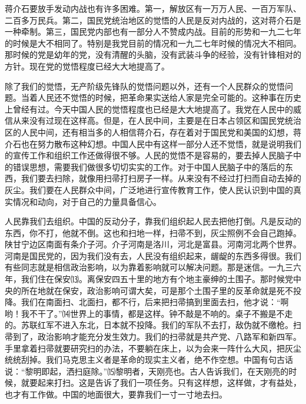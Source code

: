 \documentclass[UTF-8, a5paper, 12pt]{ctexart}
\begin{document}
    蒋介石要放手发动内战也有许多困难。第一，解放区有一万万人民、一百万军队、二百多万民兵。第二，国民党统治地区的觉悟的人民是反对内战的，这对蒋介石是一种牵制。第三，国民党内部也有一部分人不赞成内战。目前的形势和一九二七年的时候是大不相同了。特别是我党目前的情况和一九二七年时候的情况大不相同。那时候的党是幼年的党，没有清醒的头脑，没有武装斗争的经验，没有针锋相对的方针。现在党的觉悟程度已经大大地提高了。
    
    除了我们的觉悟，无产阶级先锋队的觉悟问题以外，还有一个人民群众的觉悟问题。当着人民还不觉悟的时候，把革命果实送给人家是完全可能的。这种事在历史上曾经有过。今天中国人民的觉悟程度也已经是大大地提高了。我党在人民中的威信从来没有过现在这样高。但是，在人民中间，主要是在日本占领区和国民党统治区的人民中间，还有相当多的人相信蒋介石，存在着对于国民党和美国的幻想，蒋介石也在努力散布这种幻想。中国人民中有这样一部分人还不觉悟，就是说明我们的宣传工作和组织工作还做得很不够。人民的觉悟不是容易的，要去掉人民脑子中的错误思想，需要我们做很多切切实实的工作。对于中国人民脑子中的落后的东西，我们要去扫除，就像用扫帚打扫房子一样。从来没有不经过打扫而自动去掉的灰尘。我们要在人民群众中间，广泛地进行宣传教育工作，使人民认识到中国的真实情况和动向，对于自己的力量具备信心。
    
    人民靠我们去组织。中国的反动分子，靠我们组织起人民去把他打倒。凡是反动的东西，你不打，他就不倒。这也和扫地一样，扫帚不到，灰尘照例不会自己跑掉。陕甘宁边区南面有条介子河。介子河南是洛川，河北是富县。河南河北两个世界。河南是国民党的，因为我们没有去，人民没有组织起来，龌龊的东西多得很。我们有些同志就是相信政治影响，以为靠着影响就可以解决问题。那是迷信。一九三六年，我们住在保安⒀。离保安四五十里的地方有个地主豪绅的土围子。那时候党中央的所在地就在保安，政治影响可谓大矣，可是那个土围子里的反革命就是死不投降。我们在南面扫、北面扫，都不行，后来把扫帚搞到里面去扫，他才说：“啊哟！我不干了。”⒁世界上的事情，都是这样。钟不敲是不响的。桌子不搬是不走的。苏联红军不进入东北，日本就不投降。我们的军队不去打，敌伪就不缴枪。扫帚到了，政治影响才能充分发生效力。我们的扫帚就是共产党、八路军和新四军。手里拿着扫帚就要研究扫的办法，不要躺在床上，以为会来一阵什么大风，把灰尘统统刮掉。我们马克思主义者是革命的现实主义者，绝不作空想。中国有句古话说：“黎明即起，洒扫庭除。”⒂黎明者，天刚亮也。古人告诉我们，在天刚亮的时候，就要起来打扫。这是告诉了我们一项任务。只有这样想，这样做，才有益处，也才有工作做。中国的地面很大，要靠我们一寸一寸地去扫。
    
\end{document}
